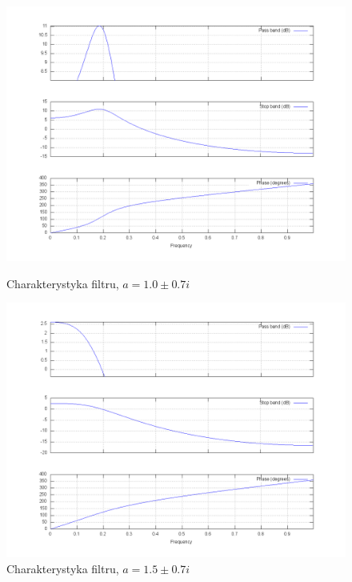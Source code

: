 \documentclass[wide,a4paper,titlepage,12pt]{mwart}
\begin{document}
  \begin{figure}[htbp]
    \begin{center}
      \includegraphics[scale=.3]{out/fig41.png}
      \caption{\label{fig41} Charakterystyka filtru, $a=1.0\pm0.7i$}
      \includegraphics[scale=.3]{out/fig42.png}
      \caption{\label{fig42} Charakterystyka filtru, $a=1.5\pm0.7i$}
  
    \end{center}
  \end{figure}
\end{document}
